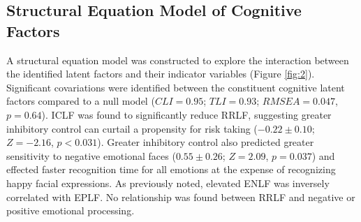 \documentclass[utf8]{stylesheet}
\begin{document}
\subsection{Structural Equation Model of Cognitive Factors} A structural equation model was constructed to explore the interaction between the identified latent factors and their indicator variables (Figure \ref{fig:2}). Significant covariations were identified between the constituent cognitive latent factors compared to a null model ($CLI = 0.95$; $TLI = 0.93$; $RMSEA = 0.047$, $p = 0.64$). ICLF was found to significantly reduce RRLF, suggesting greater inhibitory control can curtail a propensity for risk taking ($-0.22\pm0.10$; $Z=-2.16$, $p<0.031$). Greater inhibitory control also predicted greater sensitivity to negative emotional faces ($0.55\pm0.26$; $Z=2.09$, $p = 0.037$) and effected faster recognition time for all emotions at the expense of recognizing happy facial expressions. As previously noted, elevated ENLF was inversely correlated with EPLF. No relationship was found between RRLF and negative or positive emotional processing.
\end{document}
